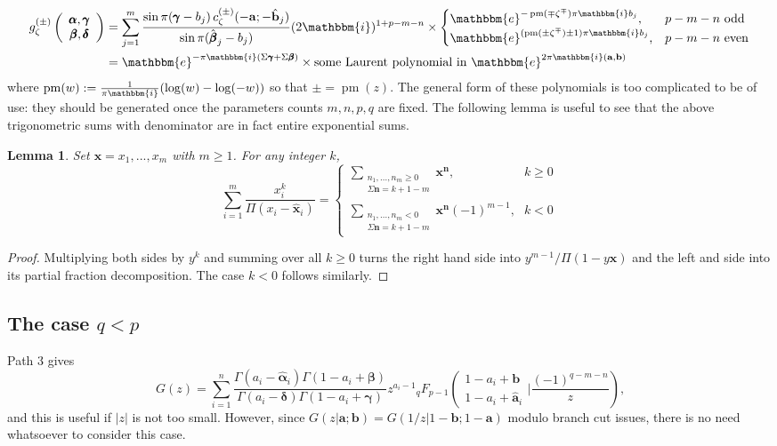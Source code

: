 \documentclass[12pt]{article}
\newcommand{\ee}[0] {\mathbbm{e}}
\newcommand{\ii}[0] {\mathbbm{i}}
\numberwithin{equation}{section}
\newtheorem{lemma}[theorem]{Lemma}
\newcommand{\FF}[6] {{}_{#1}{#2}_{#3} \left( \begin{array}{c} #4 \\ #5 \end{array} \Big| {#6}  \right)}
\newcommand{\bfa}[0] {\mathbf{a}}
\newcommand{\bfb}[0] {\mathbf{b}}
\newcommand{\bfn}[0] {\mathbf{n}}
\newcommand{\bfx}[0] {\mathbf{x}}
\newcommand{\bfalpha}[0] {\pmb{\alpha}}
\newcommand{\bfgamma}[0] {\pmb{\gamma}}
\newcommand{\bfbeta}[0]  {\pmb{\beta}}
\newcommand{\bfdelta}[0] {\pmb{\delta}}
\begin{document}
\begin{align*}
g_{\zeta}^{(\pm)}\left(\begin{array}{c} \bfalpha, \bfgamma \\ \bfbeta, \bfdelta \end{array}\right) &= \sum_{j=1}^{m} \frac{\sin \pi (\bfgamma - b_j) \, c_{\zeta}^{(\pm)}(-\bfa; -\hat{\bfb}_j)}{\sin \pi (\hat{\bfbeta}_j-b_j)} (2 \ii)^{1+p-m-n} \times \begin{cases} \ee^{-\operatorname{pm}(\mp \zeta^{\mp})\pi \ii b_j}\text{,}& p-m-n \text{ odd}\\
\ee^{(\operatorname{pm}(\pm \zeta^{\mp}) \pm 1) \pi \ii b_j}\text{,}& p-m-n \text{ even}\end{cases}\\
&= \ee^{-\pi \ii (\Sigma \bfgamma + \Sigma \bfbeta)} \times \text{some Laurent polynomial in } \ee^{2\pi \ii (\bfa, \bfb)}
\end{align*}
where $\operatorname{pm}(w) := \frac{1}{\pi \ii}(\log(w)-\log(-w))$ so that $\pm = \operatorname{pm}(z)$. The general form of these polynomials is too complicated to be of use: they should be generated once the parameters counts $m,n,p,q$ are fixed. The following lemma is useful to see that the above trigonometric sums with denominator are in fact entire exponential sums.
\begin{lemma}
\label{lemmatrig}
Set $\bfx = x_1, ..., x_m$ with $m \ge 1$. For any integer $k$,
\begin{equation*}
\sum_{i=1}^{m} \frac{x_i^k}{\Pi(x_i-\hat{\bfx}_i)} = \begin{cases} \sum\limits_{\substack{n_1, \dots, n_m \ge 0 \\ \Sigma \bfn = k+1-m}} \bfx^\bfn \text{,} & k \ge 0\\
\sum\limits_{\substack{n_1, \dots, n_m < 0 \\ \Sigma \bfn = k+1-m}} \bfx^{\bfn} (-1)^{m-1} \text{,} & k < 0
\end{cases}
\end{equation*}
\end{lemma}
\begin{proof}
Multiplying both sides by $y^k$ and summing over all $k \ge 0$ turns the right hand side into $y^{m-1} / \Pi(1-y\bfx)$ and the left and side into its partial fraction decomposition. The case $k < 0$ follows similarly.
\end{proof}

\subsection{The case $q<p$}
Path 3 gives
\begin{equation}
\label{eq_Gpath3}
G(z) = \sum_{i=1}^{n} \frac{\Gamma(a_i-\hat{\bfalpha}_i)\Gamma(1-a_i+\bfbeta)}{\Gamma(a_i-\bfdelta)\Gamma(1-a_i+\bfgamma)} z^{a_i-1}\FF{q}{F}{p-1}{1-a_i+\bfb}{1-a_i+\hat{\bfa}_i}{\frac{(-1)^{q-m-n}}{z}}\text{,}
\end{equation}
and this is useful if $|z|$ is not too small. However, since $G(z|\bfa; \bfb) = G(1/z|1-\bfb; 1-\bfa)$ modulo branch cut issues, there is no need whatsoever to consider this case.
\end{document}
